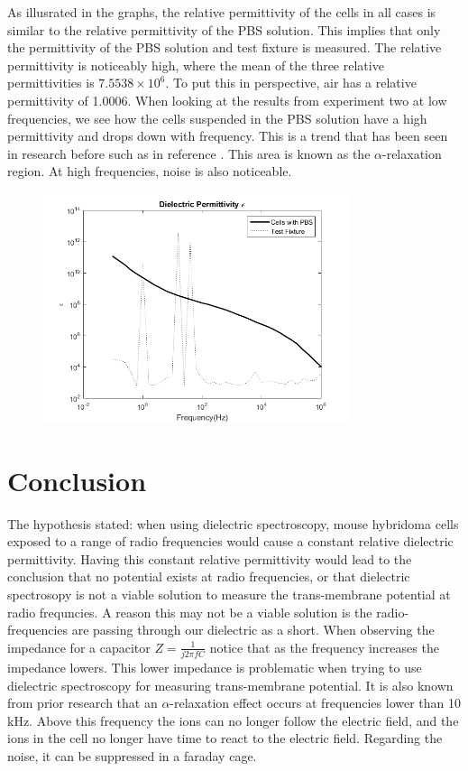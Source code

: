 \documentclass[journal]{IEEEtran}
\begin{document}
As illusrated in the graphs, the relative permittivity of the cells in all cases is similar to the relative permittivity of the PBS solution. This implies that only the permittivity of the PBS solution and test fixture is measured. The relative permittivity is noticeably high, where the mean of the three relative permittivities is $7.5538\times10^6$. To put this in perspective, air has a relative permittivity of 1.0006. When looking at the results from experiment two at low frequencies, we see how the cells suspended in the PBS solution have a high permittivity and drops down with frequency. This is a trend that has been seen in research before such as in reference \cite{Dielectric Spectroscopy}. This area is known as the $\alpha$-relaxation region. At high frequencies, noise is also noticeable. 

\begin{figure}[ht]
\label{diectric_Permittivity_Low_Freq}
\includegraphics[width = 9cm]{Epsilon_Low_Freq.png}
\end{figure}

\section{Conclusion}
The hypothesis stated: when using dielectric spectroscopy, mouse hybridoma cells exposed to a range of radio frequencies would cause a constant relative dielectric permittivity. Having this constant relative permittivity would lead to the conclusion that no potential exists at radio frequencies, or that dielectric spectrosopy is not a viable solution to measure the trans-membrane potential at radio frequncies. A reason this may not be a viable solution is the radio-frequencies are passing through our dielectric as a short. When observing the impedance for a capacitor $Z = \frac{1}{j2\pi f C}$ notice that as the frequency increases the impedance lowers. This lower impedance is problematic when trying to use dielectric spectroscopy for measuring trans-membrane potential. It is also known from prior research that an $\alpha$-relaxation effect occurs at frequencies lower than 10 kHz. Above this frequency the ions can no longer follow the electric field, and the ions in the cell no longer have time to react to the electric field. Regarding the noise, it can be suppressed in a faraday cage. 
\end{document}

